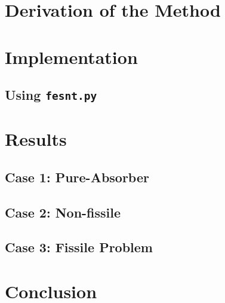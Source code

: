 \documentclass{article}
\begin{document}
\section{Derivation of the Method} \label{sec:derive}

\section{Implementation} \label{sec:implement}

\subsection{Using \texttt{fesnt.py}} \label{sec:usage}

\section{Results} \label{sec:results}

\subsection{Case 1: Pure-Absorber} \label{sec:pa}

\subsection{Case 2: Non-fissile} \label{sec:nonFissile}

\subsection{Case 3: Fissile Problem} \label{sec:fissile}

\section{Conclusion} 
\end{document}
